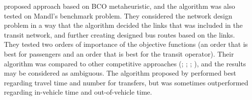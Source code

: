 \citet{nikolic14} proposed approach based on BCO metaheuristic, and the algorithm was also tested on Mandl's benchmark problem. They considered the network design problem in a way that the algorithm decided the links that was included in the transit network, and further creating designed bus routes based on the links. They tested two orders of importance of the objective functions (an order that is best for passengers and an order that is best for the transit operator). Their algorithm was compared to other competitive approaches (\citet{mandl80}; \citet{shih94}; \citet{baaj95}; \citet{bagloee11}), and the results may be considered as ambiguous. The algorithm proposed by \citet{nikolic14} performed best regarding travel time and number for transfers, but was sometimes outperformed regarding in-vehicle time and out-of-vehicle time. 






